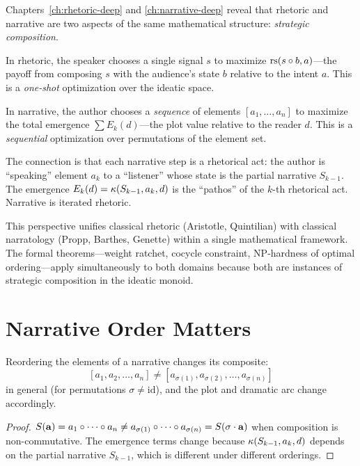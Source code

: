 \begin{remark}
\label{rem:narrative-synthesis}
Chapters~\ref{ch:rhetoric-deep} and \ref{ch:narrative-deep} reveal that
rhetoric and narrative are two aspects of the same mathematical structure:
\emph{strategic composition}.

In rhetoric, the speaker chooses a single signal $s$ to maximize
$\mathrm{rs}(s \circ b, a)$---the payoff from composing $s$ with the audience's
state $b$ relative to the intent $a$.  This is a \emph{one-shot} optimization
over the ideatic space.

In narrative, the author chooses a \emph{sequence} of elements $[a_1, \ldots,
a_n]$ to maximize the total emergence $\sum E_k(d)$---the plot value relative
to the reader $d$.  This is a \emph{sequential} optimization over permutations
of the element set.

The connection is that each narrative step is a rhetorical act: the author
is ``speaking'' element $a_k$ to a ``listener'' whose state is the partial
narrative $S_{k-1}$.  The emergence $E_k(d) = \kappa(S_{k-1}, a_k, d)$ is
the ``pathos'' of the $k$-th rhetorical act.  Narrative is iterated rhetoric.

This perspective unifies classical rhetoric (Aristotle, Quintilian) with
classical narratology (Propp, Barthes, Genette) within a single mathematical
framework.  The formal theorems---weight ratchet, cocycle constraint,
NP-hardness of optimal ordering---apply simultaneously to both domains
because both are instances of strategic composition in the ideatic monoid.
\end{remark}


\section{Narrative Order Matters}

\begin{theorem}
\label{thm:narrative-noncommutative}
Reordering the elements of a narrative changes its composite:
\[
  [a_1, a_2, \ldots, a_n] \neq [a_{\sigma(1)}, a_{\sigma(2)}, \ldots, a_{\sigma(n)}]
\]
in general (for permutations $\sigma \neq \text{id}$), and the plot and
dramatic arc change accordingly.
\end{theorem}

\begin{proof}
$S(\mathbf{a}) = a_1 \circ \cdots \circ a_n \neq
a_{\sigma(1)} \circ \cdots \circ a_{\sigma(n)} = S(\sigma \cdot \mathbf{a})$
when composition is non-commutative.  The emergence terms change because
$\kappa(S_{k-1}, a_k, d)$ depends on the partial narrative $S_{k-1}$, which
is different under different orderings.
\end{proof}

